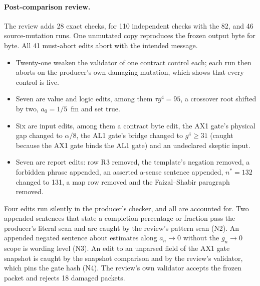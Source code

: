\paragraph{Post-comparison review.}
The review adds 28 exact checks, for 110 independent checks with the 82, and
46 source-mutation runs. One unmutated copy reproduces the frozen output byte
for byte. All 41 must-abort edits abort with the intended message.
\begin{itemize}
\item Twenty-one weaken the validator of one contract control each; each run
 then aborts on the producer's own damaging mutation, which shows that every
 control is live.
\item Seven are value and logic edits, among them $\tau g^4=95$, a crossover
 root shifted by two, $a_0=1/5$~fm and  set true.
\item Six are input edits, among them a contract byte edit, the AX1 gate's
 physical gap changed to $\alpha/8$, the AL1 gate's bridge changed to
 $g^4\ge31$ (caught because the AX1 gate binds the AL1 gate) and an
 undeclared skeptic input.
\item Seven are report edits: row R3 removed, the template's negation
 removed, a forbidden phrase appended, an asserted a-sense sentence appended,
 $n^*=132$ changed to 131, a map row removed and the Faizal--Shabir paragraph
 removed.
\end{itemize}
Four edits run silently in the producer's checker, and all are accounted for.
Two appended sentences that state a completion percentage or fraction pass
the producer's literal scan and are caught by the review's pattern scan (N2).
An appended negated sentence about estimates along $a_n\to0$ without the
$g_n\to0$ scope is wording level (N3). An edit to an unparsed field of the
AX1 gate snapshot is caught by the snapshot comparison and by the review's
validator, which pins the gate hash (N4). The review's own validator accepts
the frozen packet and rejects 18 damaged packets.

